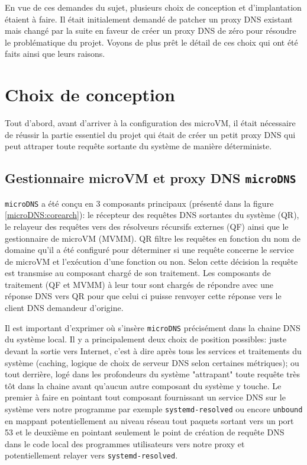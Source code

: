 \documentclass[12pt]{article}
\begin{document}
En vue de ces demandes du sujet, plusieurs choix de conception et d'implantation étaient à faire. Il était initialement demandé de patcher un proxy DNS existant mais changé par la suite en faveur de créer un proxy DNS de zéro pour résoudre le problématique du projet. Voyons de plus prêt le détail de ces choix qui ont été faits ainsi que leurs raisons.

\section{Choix de conception}
Tout d'abord, avant d'arriver à la configuration des microVM, il était nécessaire de réussir la partie essentiel du projet qui était de créer un petit proxy DNS qui peut attraper toute requête sortante du système de manière déterministe.

\subsection{Gestionnaire microVM et proxy DNS \texttt{microDNS}}
\texttt{microDNS} a été conçu en 3 composants principaux (présenté dans la figure \ref{microDNS:corearch}): le récepteur des requêtes DNS sortantes du système (QR), le relayeur des requêtes vers des résolveurs récursifs externes (QF) ainsi que le gestionnaire de microVM (MVMM). QR filtre les requêtes en fonction du nom de domaine qu'il a été configuré pour déterminer si une requête concerne le service de microVM et l'exécution d'une fonction ou non. Selon cette décision la requête est transmise au composant chargé de son traitement. Les composants de traitement (QF et MVMM) à leur tour sont chargés de répondre avec une réponse DNS vers QR pour que celui ci puisse renvoyer cette réponse vers le client DNS demandeur d'origine.

Il est important d'exprimer où s'insère \texttt{microDNS} précisément dans la chaine DNS du système local. Il y a principalement deux choix de position possibles: juste devant la sortie vers Internet, c'est à dire après tous les services et traitements du système (caching, logique de choix de serveur DNS selon certaines métriques); ou tout derrière, logé dans les profondeurs du système "attrapant" toute requête très tôt dans la chaine avant qu'aucun autre composant du système y touche. Le premier à faire en pointant tout composant fournissant un service DNS sur le système vers notre programme par exemple \texttt{systemd-resolved} ou encore \texttt{unbound} en mappant potentiellement au niveau réseau tout paquets sortant vers un port 53 et le deuxième en pointant seulement le point de création de requête DNS dans le code local des programmes utilisateurs vers notre proxy et potentiellement relayer vers \texttt{systemd-resolved}.
\end{document}
